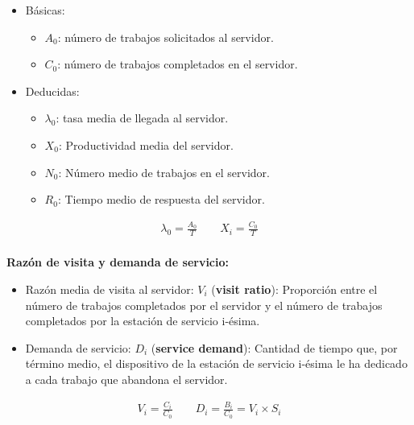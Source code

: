 \documentclass[a4paper,12pt]{article}
\begin{document}
\begin{itemize}
    \item Básicas:
    \begin{itemize}
        \item $A_0$: número de trabajos solicitados al servidor.
        \item $C_0$: número de trabajos completados en el servidor.
    \end{itemize}
    \item Deducidas:
    \begin{itemize}
        \item $\lambda_0$: tasa media de llegada al servidor.
        \item $X_0$: Productividad media del servidor.
        \item $N_0$: Número medio de trabajos en el servidor.
        \item $R_0$: Tiempo medio de respuesta del servidor. 
    \end{itemize}
\end{itemize}
\begin{tcolorbox}[colback=yellow!5!white, colframe=yellow!75!black]
    \begin{align*}
        \lambda_0 = \frac{A_0}{T} \quad \quad X_i = \frac{C_0}{T} \\
    \end{align*}
\end{tcolorbox}

\textbf{Razón de visita y demanda de servicio:}

\begin{itemize}
    \item Razón media de visita al servidor: $V_i$ (\textbf{visit ratio}): Proporción entre el número de trabajos completados por el servidor y el número de trabajos completados por la estación de servicio i-ésima.
    \item Demanda de servicio: $D_i$ (\textbf{service demand}): Cantidad de tiempo que, por término medio, el dispositivo de la estación de servicio i-ésima le ha dedicado a cada trabajo que abandona el servidor.
\end{itemize}


\begin{tcolorbox}[colback=yellow!5!white, colframe=yellow!75!black]
    \begin{align*}
        V_i = \frac{C_i}{C_0} \quad \quad D_i = \frac{B_i}{C_0} = V_i \times S_i \\
    \end{align*}
\end{tcolorbox}
\end{document}
